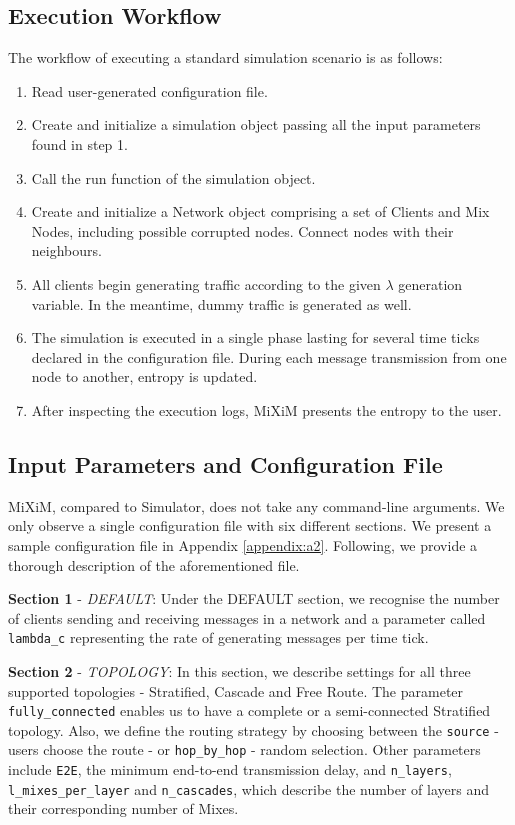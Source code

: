 \documentclass[logo,msc,cyber]{infthesis}   %
\begin{document}
\subsection{Execution Workflow}

The workflow of executing a standard simulation scenario is as follows:

\begin{enumerate}
    \item Read user-generated configuration file.
    \item Create and initialize a simulation object passing all the input
    parameters found in step 1.
    \item Call the run function of the simulation object.
    \item Create and initialize a Network object comprising a set of Clients and
    Mix Nodes, including possible corrupted nodes. Connect nodes with their
    neighbours.
    \item All clients begin generating traffic according to the given $\lambda$
    generation variable. In the meantime, dummy traffic is generated as well.
    \item The simulation is executed in a single phase lasting for several time
    ticks declared in the configuration file. During each message transmission
    from one node to another, entropy is updated.
    \item After inspecting the execution logs, MiXiM presents the entropy to the user.
\end{enumerate}

\subsection{Input Parameters and Configuration File}

MiXiM, compared to Simulator, does not take any command-line arguments. We only
observe a single configuration file with six different sections. We present a
sample configuration file in Appendix \ref{appendix:a2}. Following, we provide a thorough
description of the aforementioned file.

\textbf{Section 1} - \emph{DEFAULT}: Under the DEFAULT section, we recognise
the number of clients sending and receiving messages in a network and a
parameter called \texttt{lambda\_c} representing the rate of generating messages per time
tick. 

\textbf{Section 2} - \emph{TOPOLOGY}: In this section, we describe settings for
all three supported topologies - Stratified, Cascade and Free Route. The
parameter \texttt{fully\_connected} enables us to have a complete or a semi-connected
Stratified topology. Also, we define the routing strategy by choosing between
the \texttt{source} - users choose the route - or \texttt{hop\_by\_hop} - random
selection. Other parameters include \texttt{E2E}, the minimum end-to-end
transmission delay, and \texttt{n\_layers}, \texttt{l\_mixes\_per\_layer} and
\texttt{n\_cascades}, which describe the number of layers and their
corresponding number of Mixes.
\end{document}
